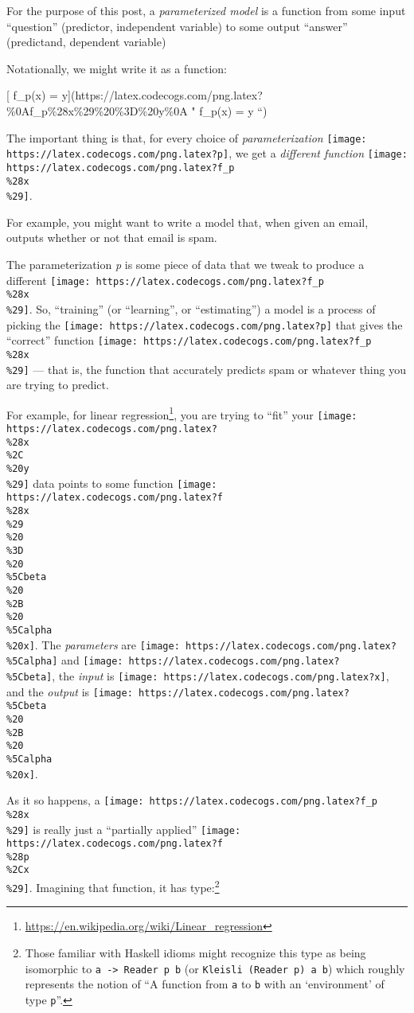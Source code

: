 \documentclass[]{article}
\renewcommand{\href}[2]{#2\footnote{\url{#1}}}
\begin{document}
For the purpose of this post, a \emph{parameterized model} is a function from
some input ``question'' (predictor, independent variable) to some output
``answer'' (predictand, dependent variable)

Notationally, we might write it as a function:

{[} f\_p(x) =
y{]}(https://latex.codecogs.com/png.latex?\%0Af\_p\%28x\%29\%20\%3D\%20y\%0A "
f\_p(x) = y ``)

The important thing is that, for every choice of \emph{parameterization}
\texttt{[image: https://latex.codecogs.com/png.latex?p]}, we get a
\emph{different function}
\texttt{[image: https://latex.codecogs.com/png.latex?f\_p\\\%28x\\\%29]}.

For example, you might want to write a model that, when given an email, outputs
whether or not that email is spam.

The parameterization \emph{p} is some piece of data that we tweak to produce a
different \texttt{[image: https://latex.codecogs.com/png.latex?f\_p\\\%28x\\\%29]}.
So, ``training'' (or ``learning'', or ``estimating'') a model is a process of
picking the \texttt{[image: https://latex.codecogs.com/png.latex?p]} that gives
the ``correct'' function
\texttt{[image: https://latex.codecogs.com/png.latex?f\_p\\\%28x\\\%29]} --- that is,
the function that accurately predicts spam or whatever thing you are trying to
predict.

For example, for \href{https://en.wikipedia.org/wiki/Linear_regression}{linear
regression}, you are trying to ``fit'' your
\texttt{[image: https://latex.codecogs.com/png.latex?\\\%28x\\\%2C\\\%20y\\\%29]} data
points to some function
\texttt{[image: https://latex.codecogs.com/png.latex?f\\\%28x\\\%29\\\%20\\\%3D\\\%20\\\%5Cbeta\\\%20\\\%2B\\\%20\\\%5Calpha\\\%20x]}.
The \emph{parameters} are
\texttt{[image: https://latex.codecogs.com/png.latex?\\\%5Calpha]} and
\texttt{[image: https://latex.codecogs.com/png.latex?\\\%5Cbeta]}, the
\emph{input} is \texttt{[image: https://latex.codecogs.com/png.latex?x]}, and
the \emph{output} is
\texttt{[image: https://latex.codecogs.com/png.latex?\\\%5Cbeta\\\%20\\\%2B\\\%20\\\%5Calpha\\\%20x]}.

As it so happens, a
\texttt{[image: https://latex.codecogs.com/png.latex?f\_p\\\%28x\\\%29]} is really
just a ``partially applied''
\texttt{[image: https://latex.codecogs.com/png.latex?f\\\%28p\\\%2Cx\\\%29]}.
Imagining that function, it has type:\footnote{Those familiar with Haskell
  idioms might recognize this type as being isomorphic to
  \texttt{a\ -\textgreater{}\ Reader\ p\ b} (or
  \texttt{Kleisli\ (Reader\ p)\ a\ b}) which roughly represents the notion of
  ``A function from \texttt{a} to \texttt{b} with an `environment' of type
  \texttt{p}''.}
\end{document}
